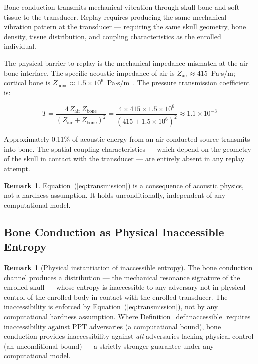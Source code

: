 \documentclass[11pt,a4paper]{article}
\theoremstyle{definition}
\newtheorem{remark}[theorem]{Remark}
\begin{document}
Bone conduction transmits mechanical vibration through skull bone and
soft tissue to the transducer. Replay requires producing the same
mechanical vibration pattern at the transducer --- requiring the same
skull geometry, bone density, tissue distribution, and coupling
characteristics as the enrolled individual.

The physical barrier to replay is the mechanical impedance mismatch
at the air-bone interface. The specific acoustic impedance of air is
$Z_\text{air} \approx 415$~Pa$\cdot$s/m; cortical bone is
$Z_\text{bone} \approx 1.5 \times 10^6$~Pa$\cdot$s/m~\cite{Acoustics}.
The pressure transmission coefficient is:

\begin{equation}
\label{eq:transmission}
T = \frac{4\, Z_\text{air}\, Z_\text{bone}}{(Z_\text{air} +
Z_\text{bone})^2}
= \frac{4 \times 415 \times 1.5 \times 10^6}{(415 + 1.5 \times
10^6)^2}
\approx 1.1 \times 10^{-3}
\end{equation}

Approximately 0.11\% of acoustic energy from an air-conducted source
transmits into bone. The spatial coupling characteristics --- which
depend on the geometry of the skull in contact with the transducer
--- are entirely absent in any replay attempt.

\begin{remark}
Equation~(\ref{eq:transmission}) is a consequence of acoustic
physics, not a hardness assumption. It holds unconditionally,
independent of any computational model.
\end{remark}

\subsection{Bone Conduction as Physical Inaccessible Entropy}

\begin{remark}[Physical instantiation of inaccessible entropy]
\label{rem:physical_ie}
The bone conduction channel produces a distribution --- the mechanical
resonance signature of the enrolled skull --- whose entropy is
inaccessible to any adversary not in physical control of the enrolled
body in contact with the enrolled transducer. The inaccessibility is
enforced by Equation~(\ref{eq:transmission}), not by any
computational hardness assumption. Where Definition~\ref{def:inaccessible}
requires inaccessibility against PPT adversaries (a computational
bound), bone conduction provides inaccessibility against \emph{all}
adversaries lacking physical control (an unconditional bound) ---
a strictly stronger guarantee under any computational model.
\end{remark}
\end{document}
